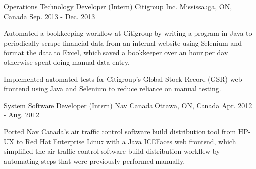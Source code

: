 \begin{cventries}
  \cventry
    {Operations Technology Developer (Intern)} %
    {Citigroup Inc.} %
    {Mississauga, ON, Canada} %
    {Sep. 2013 - Dec. 2013} %
    {
      \begin{cvitems} %
        \item {
          Automated a bookkeeping workflow at Citigroup by writing a program in Java to
          periodically scrape financial data from an internal website using Selenium
          and format the data to Excel, which saved a bookkeeper over an hour per day
          otherwise spent doing manual data entry.
        }
        \item {
          Implemented automated tests for Citigroup's Global Stock Record
          (GSR) web frontend using Java and Selenium to reduce reliance on manual
          testing.
        }
      \end{cvitems}
    }

  \cventry
    {System Software Developer (Intern)} %
    {Nav Canada} %
    {Ottawa, ON, Canada} %
    {Apr. 2012 - Aug. 2012} %
    {
      \begin{cvitems} %
        \item {
          Ported Nav Canada's air traffic control software build distribution tool from
          HP-UX to Red Hat Enterprise Linux with a Java ICEFaces web frontend, which
          simplified the air traffic control software build distribution workflow by
          automating steps that were previously performed manually.
        }
      \end{cvitems}
    }

\end{cventries}
